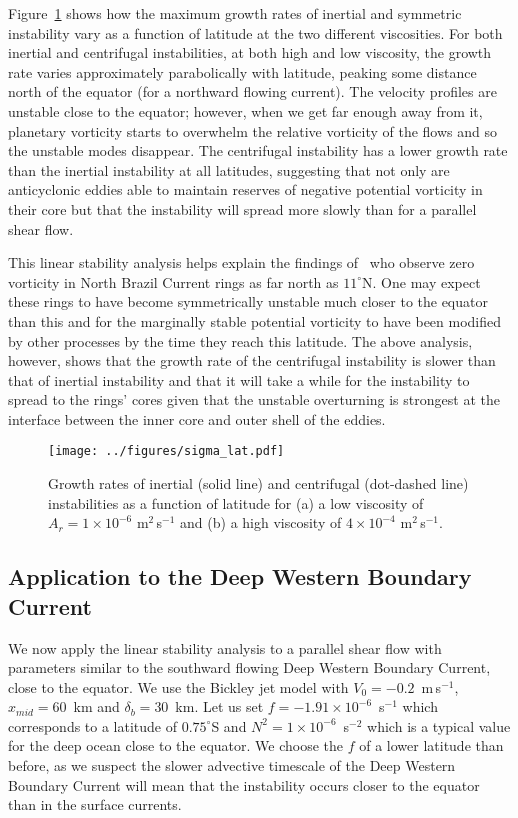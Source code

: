 Figure~\ref{fig:SigmaAndLat} shows how the maximum growth rates of inertial and symmetric instability vary as a function of latitude at the two different viscosities. For both inertial and centrifugal instabilities, at both high and low viscosity, the growth rate varies approximately parabolically with latitude, peaking some distance north of the equator (for a northward flowing current). The velocity profiles are unstable close to the equator; however, when we get far enough away from it, planetary vorticity starts to overwhelm the relative vorticity of the flows and so the unstable modes disappear. The centrifugal instability has a lower growth rate than the inertial instability at all latitudes, suggesting that not only are anticyclonic eddies able to maintain reserves of negative potential vorticity in their core but that the instability will spread more slowly than for a parallel shear flow.

This linear stability analysis helps explain the findings of~\citet{Castelao2011} who observe zero vorticity in North Brazil Current rings as far north as $11^\circ$N. One may expect these rings to have become symmetrically unstable much closer to the equator than this and for the marginally stable potential vorticity to have been modified by other processes by the time they reach this latitude. The above analysis, however, shows that the growth rate of the centrifugal instability is slower than that of inertial instability and that it will take a while for the instability to spread to the rings' cores given that the unstable overturning is strongest at the interface between the inner core and outer shell of the eddies.

\begin{figure}
    \centering
    \texttt{[image: ../figures/sigma\_lat.pdf]}
    \caption{Growth rates of inertial (solid line) and centrifugal (dot-dashed line) instabilities as a function of latitude for (a) a low viscosity of $A_r = 1 \times 10^{-6}$ m$^2\,$s$^{-1}$ and (b) a high viscosity of $4 \times 10^{-4}$ m$^2\,$s$^{-1}$.}
    \label{fig:SigmaAndLat}
\end{figure}

\subsection{Application to the Deep Western Boundary Current}
We now apply the linear stability analysis to a parallel shear flow with parameters similar to the southward flowing Deep Western Boundary Current, close to the equator. We use the Bickley jet model with $V_0 = - 0.2$~m$\,$s$^{-1}$, $x_{mid} = 60$~km and $\delta_b = 30$~km. Let us set $f = - 1.91 \times 10^{-6}$~s$^{-1}$ which corresponds to a latitude of $0.75^\circ$S and $N^2 = 1 \times 10^{-6}$~s$^{-2}$ which is a typical value for the deep ocean close to the equator. We choose the $f$ of a lower latitude than before, as we suspect the slower advective timescale of the Deep Western Boundary Current will mean that the instability occurs closer to the equator than in the surface currents\footnotemark.

